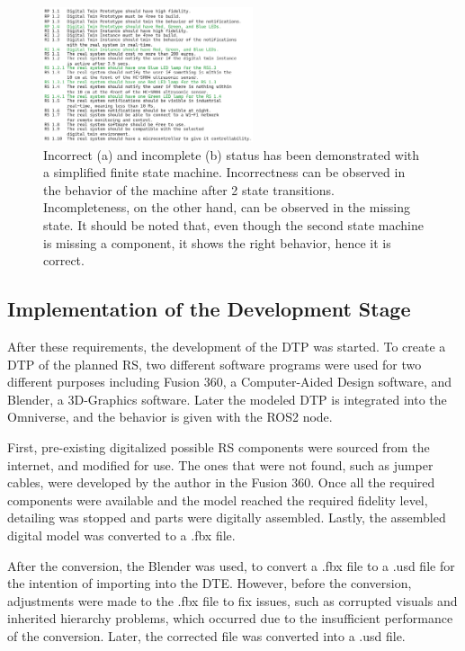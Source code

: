 \documentclass[conference]{IEEEtran}
\begin{document}
    \begin{figure}[htbp]
        \centering
        \includegraphics[width=0.55\textwidth]{Requirements.png}
        \caption{Incorrect (a) and incomplete (b) status has been demonstrated with a simplified finite state machine. Incorrectness can be observed in the behavior 
        of the machine after 2 state transitions. Incompleteness, on the other hand, can be observed in the missing state. It should be noted that, even though the second state machine is missing a 
        component, it shows the right behavior, hence it is correct.}\label{fig:Requirements}
    \end{figure}

    \subsection{Implementation of the Development Stage}
    After these requirements, the development of the DTP was started. To create a DTP of the planned RS, two different software programs were used for two different purposes including Fusion 360, 
    a Computer-Aided Design software, and Blender, a 3D-Graphics software. Later the modeled DTP is integrated into the Omniverse, and the behavior is given with the ROS2 node.

    First, pre-existing digitalized possible RS components were sourced from the internet, and modified for use. The ones that were not found, such as jumper cables, were developed by the author 
    in the Fusion 360. Once all the required components were available and the model reached the required fidelity level, detailing was stopped and parts were digitally assembled. 
    Lastly, the assembled digital model was converted to a .fbx file.

    After the conversion, the Blender was used, to convert a .fbx file to a .usd file for the intention of importing into the DTE. However, before the conversion, 
    adjustments were made to the .fbx file to fix issues, such as corrupted visuals and inherited hierarchy problems, which occurred due to the insufficient performance of the conversion. 
    Later, the corrected file was converted into a .usd file. 
\end{document}

